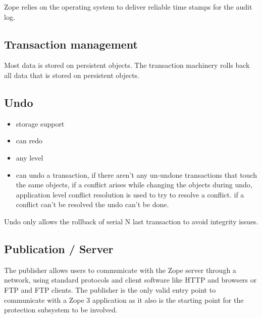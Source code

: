 \documentclass[12pt,english]{scrbook}
\begin{document}
Zope relies on the operating system to deliver reliable time stamps for the
audit log.





\subsection{Transaction management}

Most data is stored on persistent objects. The transaction machinery rolls back
all data that is stored on persistent objects.





\subsection{Undo}
\begin{itemize}
\item {} 
storage support

\item {} 
can redo

\item {} 
any level

\item {} 
can undo a transaction, if there aren't any un-undone transactions that touch
the same objects, if a conflict arises while changing the objects during
undo, application level conflict resolution is used to try to resolve a
conflict. if a conflict can't be resolved the undo can't be done.

\end{itemize}

Undo only allows the rollback of serial N last transaction to avoid integrity issues.





\subsection{Publication / Server}

The publisher allows users to communicate with the Zope server through a
network, using standard protocols and client software like HTTP and browsers or
FTP and FTP clients. The publisher is the only valid entry point to communicate
with a Zope 3 application as it also is the starting point for the protection
subsystem to be involved.
\end{document}
